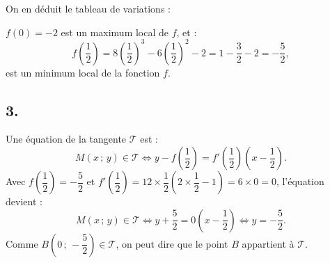 \documentclass[10pt]{article}
\begin{document}
	On en déduit le tableau de variations :
	\begin{center}
\end{center}
		\(f(0) = -2\) est un maximum local de \(f\), et :
		\[
		f\left(\dfrac{1}{2}\right) = 8\left(\dfrac{1}{2}\right)^3 - 6\left(\dfrac{1}{2}\right)^2 - 2 = 1 - \dfrac{3}{2} - 2 = -\dfrac{5}{2},
		\]
		est un minimum local de la fonction \(f\).

	
	\subsection*{3.}
	Une équation de la tangente \( \mathcal T \) est :
	\[
	M(x\,;\,y) \in  \mathcal T \iff y - f\left(\dfrac{1}{2}\right) = f'\left(\dfrac{1}{2}\right)\left(x - \dfrac{1}{2}\right).
	\]
	Avec \( f\left(\dfrac{1}{2}\right) = -\dfrac{5}{2} \) et \( f'\left(\dfrac{1}{2}\right) = 12 \times \dfrac{1}{2} \left(2 \times \dfrac{1}{2} - 1\right) = 6 \times 0 = 0 \), l'équation devient :
	\[
	M(x\,;\,y) \in  \mathcal T \iff y + \dfrac{5}{2} = 0 \left(x - \dfrac{1}{2}\right) \iff y = -\dfrac{5}{2}.
	\]
	Comme $ B\left(0\,;\,-\dfrac{5}{2}\right) \in  \mathcal T$, on peut dire que le point \( B \) appartient à \(  \mathcal T \).
\end{document}

